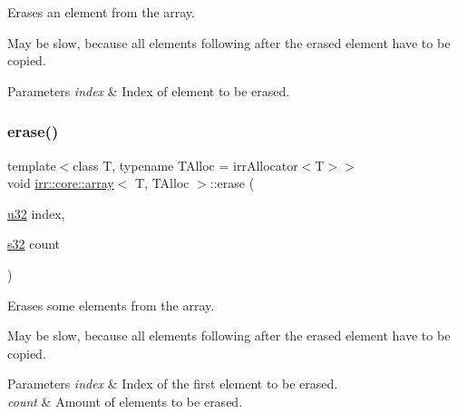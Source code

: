 Erases an element from the array. 

May be slow, because all elements following after the erased element have to be copied. 
\begin{DoxyParams}{Parameters}
{\em index} & Index of element to be erased. \\
\hline
\end{DoxyParams}
\mbox{\label{classirr_1_1core_1_1array_ab9bb8cb0e6ebc4839fa2f7bc8e626800}} 
\subsubsection{\texorpdfstring{erase()}{erase()}\hspace{0.1cm}{\footnotesize\ttfamily [3/4]}}
{\footnotesize\ttfamily template$<$class T, typename T\+Alloc = irr\+Allocator$<$\+T$>$$>$ \\
void \hyperlink{classirr_1_1core_1_1array}{irr\+::core\+::array}$<$ T, T\+Alloc $>$\+::erase (\begin{DoxyParamCaption}\item[{\hyperlink{namespaceirr_a0416a53257075833e7002efd0a18e804}{u32}}]{index,  }\item[{\hyperlink{namespaceirr_ac66849b7a6ed16e30ebede579f9b47c6}{s32}}]{count }\end{DoxyParamCaption})\hspace{0.3cm}{\ttfamily [inline]}}



Erases some elements from the array. 

May be slow, because all elements following after the erased element have to be copied. 
\begin{DoxyParams}{Parameters}
{\em index} & Index of the first element to be erased. \\
\hline
{\em count} & Amount of elements to be erased. \\
\hline
\end{DoxyParams}
\mbox{\label{classirr_1_1core_1_1array_ab9bb8cb0e6ebc4839fa2f7bc8e626800}} 
